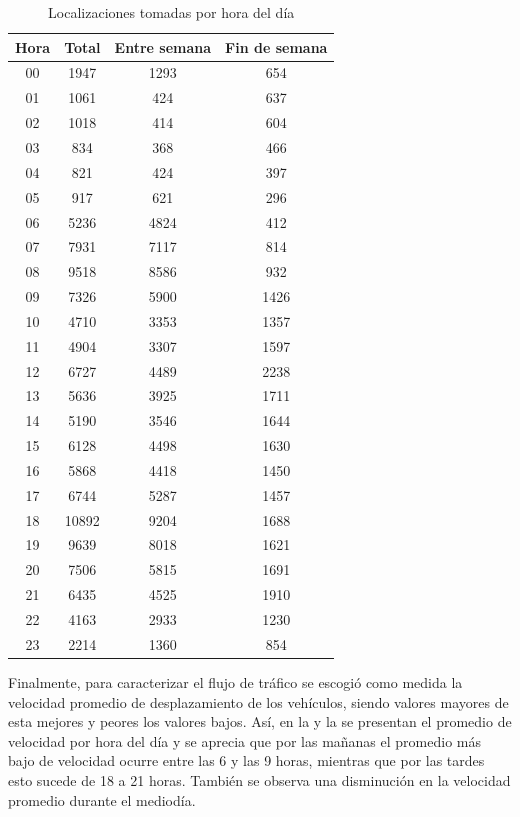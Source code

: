 \begin{table}[!h]
	\centering
	\begin{tabular}{cccc}
        \toprule
    	Hora  & Total & Entre semana & Fin de semana\\
    	\midrule
    	00 & 1947 & 1293 & 654 \\
    	01 & 1061 & 424 & 637 \\
    	02 & 1018 & 414 & 604 \\ 
    	03 & 834 & 368 & 466\\
    	04 & 821 & 424 & 397\\
    	05 & 917 & 621 & 296\\
    	06 & 5236 & 4824 & 412 \\
    	07 & 7931 & 7117 & 814\\
    	08 & 9518 & 8586 & 932\\
    	09 & 7326 & 5900 & 1426\\ 
    	10 & 4710 & 3353 & 1357\\
    	11 & 4904 & 3307 & 1597\\
    	12 & 6727 & 4489 & 2238\\
    	13 & 5636 & 3925 & 1711\\
    	14 & 5190 & 3546 & 1644\\
    	15 & 6128 & 4498 & 1630\\
    	16 & 5868 & 4418 & 1450\\ 
    	17 & 6744 & 5287 & 1457\\
    	18 & 10892 & 9204 & 1688\\
    	19 & 9639 & 8018 & 1621\\
    	20 & 7506 & 5815 & 1691\\
    	21 & 6435 & 4525 & 1910\\
    	22 & 4163 & 2933 & 1230 \\
    	23 & 2214 & 1360 & 854\\
    	\bottomrule
	\end{tabular}
	\caption{Localizaciones tomadas por hora del día} 
	\label{table:localizaciones_por_hora}
\end{table}

Finalmente, para caracterizar el flujo de tráfico se escogió como medida la velocidad promedio de desplazamiento de los vehículos, siendo valores mayores de esta mejores y peores los valores bajos. Así, en la  y la  se presentan el promedio de velocidad por hora del día y se aprecia que por las mañanas el promedio más bajo de velocidad ocurre entre las 6 y las 9 horas, mientras que por las tardes esto sucede de 18 a 21 horas. También se observa una disminución en la velocidad promedio durante el mediodía. 

